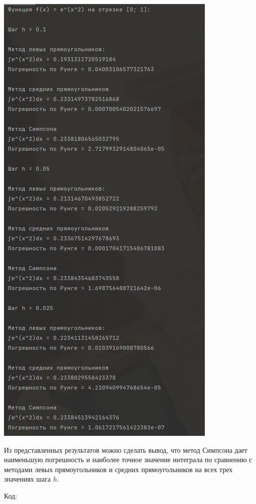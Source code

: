 \documentclass[a4paper]{article}
\begin{document}
\includegraphics[scale=0.7]{results}

Из представленных результатов можно сделать вывод, что метод Симпсона дает наименьшую погрешность и наиболее точное значение интеграла по сравнению с методами левых прямоугольников и средних прямоугольников на всех трех значениях шага $h$.

Код:

 
\end{document}

